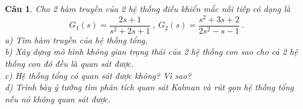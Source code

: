 \documentclass[11pt]{article}
\newtheorem{bt}{Câu}
\begin{document}
\begin{bt}
	Cho 2 hàm truyền của 2 hệ thống điều khiển mắc nối tiếp có dạng là
	\begin{equation*}
		G_1(s) = \dfrac{2s+1}{s^2+2s+1} \ , \	G_2(s) = \dfrac{s^2+3s+2}{2s^2-s-1} \ . 
	\end{equation*}
	a) Tìm hàm truyền của hệ thống tổng. \\
	b) Xây dựng mô hình không gian trạng thái của 2 hệ thống con sao cho cả 2 hệ thống con đó đều là quan sát được. \\
	c) Hệ thống tổng có quan sát được không? Vì sao? \\
	d) Trình bày ý tưởng tìm phân tích quan sát Kalman và rút gọn hệ thống tổng
	nếu nó không quan sát được.
\end{bt}
	
\end{document}

